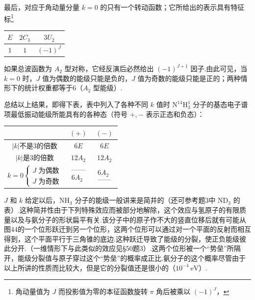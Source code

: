 最后，对应于角动量分量 $k=0$ 的只有一个转动函数；它所给出的表示具有特征标\footnote{角动量值为 $J$ 而投影值为零的本征函数旋转 $\pi$ 角后被乘以 $(-1)^J$，}
\begin{center}
\begin{tabular}{ccc}
  $E$ & $2C_3$ & $3U_2$\\ \hline
  $1$ & $1$ & $(-1)^J$\\ \hline
\end{tabular}
\end{center}
如果总波函数为 $A_2$ 型对称，它经反演后必然给出 $(-1)^{J+1}$ 因子.由此可见，当 $k=0$ 时，$J$ 值为偶数的能级只能是负的，$J$ 值为奇数的能级只能是正的；两种情形下的统计权重都等于6（$A_2$ 型能级）.

总结以上结果，即得下表，表中列入了各种不同 $k$ 值时 $\mathrm{N^{14}H_3^1}$ 分子的基态电子谱项最低振动能级所能具有的各种态（符号 $+,-$ 表示正态和负态）：
\begin{center}
\begin{tabular}{|c|c|c|}
\hline
  & $(+)$ & $(-)$\\ \hline
  $|k|$不是3的倍数 & $6E$ & $6E$\\ \hline
  $|k|$是3的倍数 & $12A_2$ & $12A_2$\\ \hline
  $k=0\left\{\begin{array}{l}J\text{ 为偶数}\\ J\text{ 为奇数}\end{array}\right.$
  & $\begin{array}{c}\text{——}\\ 6A_2\end{array}$
  & $\begin{array}{c}6A_2\\ \text{——}\end{array}$\\ \hline
\end{tabular}
\end{center}
$J$ 和 $k$ 给定以后，$\mathrm{NH_3}$ 分子的能级一般讲来是简并的（还可参考题3中 $\mathrm{ND_3}$ 的表）.这种简并性由于下列特殊效应而被部分地解除，这个效应与氢原子的有限质量以及与氨分子的形状扁平有关.该分子中的原子作不大的竖直位移后就有可能从图44的一个位形跃迁到另一个位形，这两个位形可以通过对一个平面的反射而相互得到，这个平面平行于三角锥的底边.这种跃迁导致了能级的分裂，使正负能级彼此分开.（一维情形下与此类似的效应见§50题3）.这两个位形被一个“势垒”所隔开，能级分裂值与原子穿过这个“势垒”的概率成正比.氨分子的这个概率尽管由于以上所讲的性质而比较大，但是它的分裂值还是很小的（$10^{-4}\ \mathrm{eV}$）.

